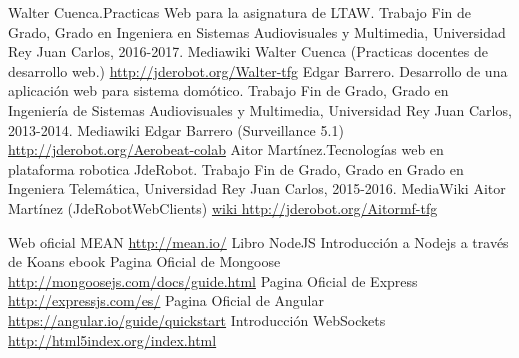 \documentclass[oneside,a4paper,11pt]{book}
\begin{document}
%
\thispagestyle{empty}
\begin{thebibliography}{99}
 Walter Cuenca.Practicas Web para la asignatura de LTAW. Trabajo Fin de Grado, Grado en Ingeniera en Sistemas Audiovisuales y Multimedia, Universidad Rey Juan Carlos, 2016-2017.
 Mediawiki Walter Cuenca (Practicas docentes de desarrollo web.) \url{http://jderobot.org/Walter-tfg}
 Edgar Barrero. Desarrollo de una aplicación web para sistema domótico. Trabajo Fin de Grado, Grado en Ingeniería de Sistemas Audiovisuales y Multimedia, Universidad Rey Juan Carlos, 2013-2014.
 Mediawiki Edgar Barrero (Surveillance 5.1) \url{http://jderobot.org/Aerobeat-colab}
 Aitor Martínez.Tecnologías web en plataforma robotica JdeRobot. Trabajo Fin de Grado, Grado en Grado en Ingeniera Telemática, Universidad Rey Juan Carlos, 2015-2016.
 MediaWiki Aitor Martínez (JdeRobotWebClients) \url{wiki http://jderobot.org/Aitormf-tfg}

 Web oficial MEAN \url{http://mean.io/}
 Libro NodeJS \textnormal{Introducción a Nodejs a través de Koans ebook}
 Pagina Oficial de Mongoose \url{http://mongoosejs.com/docs/guide.html}
 Pagina Oficial de Express  \url{http://expressjs.com/es/}
 Pagina Oficial de Angular  \url{https://angular.io/guide/quickstart}
 Introducción WebSockets  \url{http://html5index.org/index.html}


\end{thebibliography}
\end{document}

